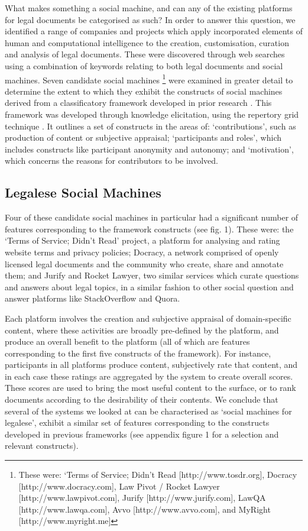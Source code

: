 \documentclass{sig-alternate}
\begin{document}
What makes something a social machine, and can any of the existing platforms for legal documents be categorised as such? In order to answer this question, we identified a range of companies and projects which apply incorporated elements of human and computational intelligence to the creation, customisation, curation and analysis of legal documents. These were discovered through web searches using a combination of keywords relating to both legal documents and social machines. Seven candidate social machines \footnote{These were: `Terms of Service; Didn't Read [http://www.tosdr.org], Docracy [http://www.docracy.com], Law Pivot / Rocket Lawyer [http://www.lawpivot.com], Jurify [http://www.jurify.com], LawQA [http://www.lawqa.com], Avvo [http://www.avvo.com], and MyRight [http://www.myright.me]} were examined in greater detail to determine the extent to which they exhibit the constructs of social machines derived from a classificatory framework developed in prior research \cite{shadbolt:classif}. This framework 
was developed through knowledge elicitation, using the repertory grid technique \cite{kelly:constructs}. It outlines a set of constructs in the areas of: `contributions', such as production of content or subjective appraisal; `participants and roles', which includes constructs like participant anonymity and autonomy; and `motivation', which concerns the reasons for contributors to be involved.

\subsection{Legalese Social Machines}

Four of these candidate social machines in particular had a significant number of features corresponding to the framework constructs (see fig. 1). These were: the `Terms of Service; Didn't Read' project, a platform for analysing and rating website terms and privacy policies; Docracy, a network comprised of openly licensed legal documents and the community who create, share and annotate them; and Jurify and Rocket Lawyer, two similar services which curate questions and answers about legal topics, in a similar fashion to other social question and answer platforms like StackOverflow and Quora.

Each platform involves the creation and subjective appraisal of domain-specific content, where these activities are broadly pre-defined by the platform, and produce an overall benefit to the platform (all of which are features corresponding to the first five constructs of the framework). For instance, participants in all platforms produce content, subjectively rate that content, and in each case these ratings are aggregated by the system to create overall scores. These scores are used to bring the most useful content to the surface, or to rank documents according to the desirability of their contents. We conclude that several of the systems we looked at can be characterised as `social machines for legalese', exhibit a similar set of features corresponding to the constructs developed in previous frameworks (see appendix figure 1 for a selection and relevant constructs).
\end{document}
